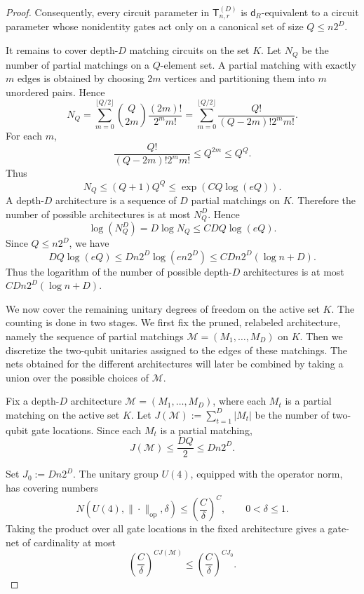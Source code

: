\documentclass[10pt,a4paper]{amsart}
\begin{document}
\begin{proof}
Consequently, every circuit parameter in \(\mathsf{T}_{n,r}^{(D)}\) is
\(\mathsf{d}_{R}\)-equivalent to a circuit parameter whose nonidentity gates act only
on a canonical set of size $Q\le n2^D$. 


It remains to cover depth-\(D\) matching circuits on the set \(K\). Let \(N_Q\) be the number of partial matchings on a \(Q\)-element set. A partial matching with exactly \(m\) edges is
obtained by choosing \(2m\) vertices and partitioning them into \(m\) unordered
pairs. Hence
\[
    N_Q
    =
    \sum_{m=0}^{\lfloor Q/2\rfloor}
    \binom{Q}{2m} \frac{(2m)!}{2^m m!}
    =
    \sum_{m=0}^{\lfloor Q/2\rfloor}
    \frac{Q!}{(Q-2m)!2^m m!}.
\]
For each \(m\),
\[
    \frac{Q!}{(Q-2m)!2^m m!}
    \le Q^{2m}\le Q^Q.
\]
Thus
\[
    N_Q
    \le
    (Q+1)Q^Q
    \le
    \exp (CQ\log(eQ)).
\]
A depth-\(D\) architecture is a sequence of \(D\) partial matchings on \(K\). Therefore the number of possible architectures is at most \(N_Q^D\). Hence
\[
    \log(N_Q^D)
    =
    D\log N_Q
    \le
    C DQ\log(eQ).
\]
Since \(Q\le n2^D\), we have
\[
    DQ\log(eQ)
    \le
    Dn2^D\log(en2^D)
    \le
    C Dn2^D(\log n+D).
\]
Thus the logarithm of the number of possible depth-\(D\) architectures is at most $C Dn2^D(\log n+D)$.

We now cover the remaining unitary degrees of freedom on the active set \(K\). The counting is done in two stages. We first fix the pruned, relabeled architecture, namely the sequence of partial matchings \(\mathcal M=(M_1,\dots,M_D)\) on \(K\). Then we discretize the two-qubit unitaries assigned to the edges of these matchings. The nets obtained for the different architectures will later be combined by taking a union over the possible choices of \(\mathcal M\).

Fix a depth-\(D\) architecture $\mathcal M=(M_1,\dots,M_D)$, where each \(M_t\) is a partial matching on the active set $K.$ Let $J(\mathcal M):=\sum_{t=1}^D |M_t|$ be the number of two-qubit gate locations. Since each \(M_t\) is a partial
matching, 
\[J(\mathcal M)\le \frac{DQ}{2}\le Dn2^D.\]

Set $J_0:=Dn2^D.$ The unitary group \(U(4)\), equipped with the operator norm, has covering numbers
\[
    N(U(4),\|\cdot\|_{\mathrm{op}},\delta)
    \le
    \left(\frac{C}{\delta}\right)^C,
    \qquad 0<\delta\le1.
\]
Taking the product over all gate locations in the fixed architecture gives a
gate-net of cardinality at most
\[
    \left(\frac{C}{\delta}\right)^{C J(\mathcal M)}
    \le
    \left(\frac{C}{\delta}\right)^{C J_0}.
\]


\end{proof}
\end{document}
